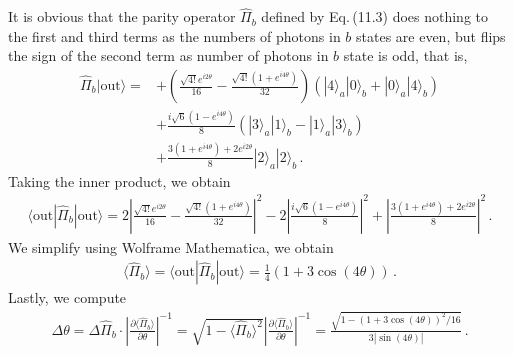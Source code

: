 \documentclass[11pt, oneside]{book}
\theoremstyle{break}
\theoremstyle{break}
\newcommand{\pd}{\partial}
\begin{document}
It is obvious that the parity operator $\hat{\Pi}_b$ defined by Eq.\,(11.3) does nothing to the first and third terms as the numbers of photons in $b$ states are even, but flips the sign of the second term as number of photons in $b$ state is odd, that is, 
\begin{align*}
\hat{\Pi}_b |\text{out}\rangle  
=&+\left(\frac{\sqrt{4!}e^{i2\theta}}{16} - \frac{\sqrt{4!}(1+e^{i4\theta})}{32}\right)\left( |4\rangle_a | 0\rangle_b + |0\rangle_a|4\rangle_b\right)\\
&+\frac{i\sqrt{6}(1-e^{i4\theta})}{8}(|3\rangle_a|1\rangle_b - |1\rangle_a |3\rangle_b) \\
&+ \frac{3(1+e^{i4\theta})+ 2e^{i2\theta}}{8}|2\rangle_a|2\rangle_b\,.
\end{align*}
Taking the inner product, we obtain
\begin{align*}
\langle \text{out}| \hat{\Pi}_b|\text{out}\rangle = 2\left|\frac{\sqrt{4!}e^{i2\theta}}{16} - \frac{\sqrt{4!}(1+e^{i4\theta})}{32}\right|^2 - 2\left|\frac{i\sqrt{6}(1-e^{i4\theta})}{8}\right|^2 + \left|\frac{3(1+e^{i4\theta})+ 2e^{i2\theta}}{8}\right|^2\,.
\end{align*}
We simplify using Wolframe Mathematica, we obtain
\begin{align*}
\langle \hat{\Pi}_b\rangle =  \langle \text{out}| \hat{\Pi}_b|\text{out}\rangle = \frac{1}{4}\left( 1+ 3\cos(4\theta)\right)\,.
\end{align*}
Lastly, we compute
\begin{align*}
\Delta \theta = \Delta \hat{\Pi}_b \cdot \left|\frac{\pd\langle \hat{\Pi}_b\rangle}{\pd\theta}  \right|^{-1} = \sqrt{1 - \langle \hat{\Pi}_b\rangle^2}\left|\frac{\pd\langle \hat{\Pi}_b\rangle}{\pd\theta}  \right|^{-1}
=\frac{\sqrt{1 - (1+ 3\cos(4\theta))^2/16}}{3|\sin(4\theta)|}\,.
\end{align*}
\end{document}
